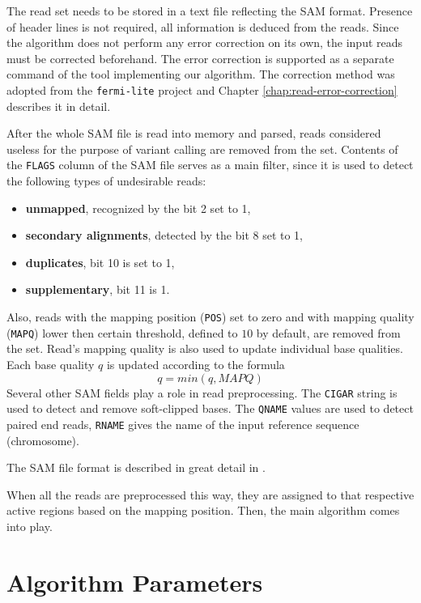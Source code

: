 The read set needs to be stored in a text file reflecting the SAM format. Presence of header lines is not required, all information is deduced from the reads. Since the algorithm does not perform any error correction on its own, the input reads must be corrected beforehand. The error correction is supported as a separate command of the tool implementing our algorithm. The correction method was adopted from the \texttt{fermi-lite}\cite{fermi-lite} project and Chapter \ref{chap:read-error-correction} describes it in detail.

After the whole SAM file is read into memory and parsed, reads considered useless for the purpose of variant calling are removed from the set. Contents of the \texttt{FLAGS} column of the SAM file serves as a main filter, since it is used to detect the following types of undesirable reads:
\begin{itemize}
\item \textbf{unmapped}, recognized by the bit 2 set to 1,
\item \textbf{secondary alignments}, detected by the bit 8 set to 1,
\item \textbf{duplicates}, bit 10 is set to 1,
\item \textbf{supplementary}, bit 11 is 1.
\end{itemize}

Also, reads with the mapping position (\texttt{POS}) set to zero and with mapping quality (\texttt{MAPQ}) lower then certain threshold, defined to $10$ by default, are removed from the set. Read's mapping quality is also used to update individual base qualities. Each base quality $q$ is updated according to the formula
$$
q = min(q, MAPQ)
$$
Several other SAM fields play a role in read preprocessing. The \texttt{CIGAR} string is used to detect and remove soft-clipped bases. The \texttt{QNAME} values are used to detect paired end reads, \texttt{RNAME} gives the name of the input reference sequence (chromosome).

The SAM file format is described in great detail in \cite{sambam}.

When all the reads are preprocessed this way, they are assigned to that respective active regions based on the mapping position. Then, the main algorithm comes into play.

\section{Algorithm Parameters}
\label{sec:algorithm-parameters}

